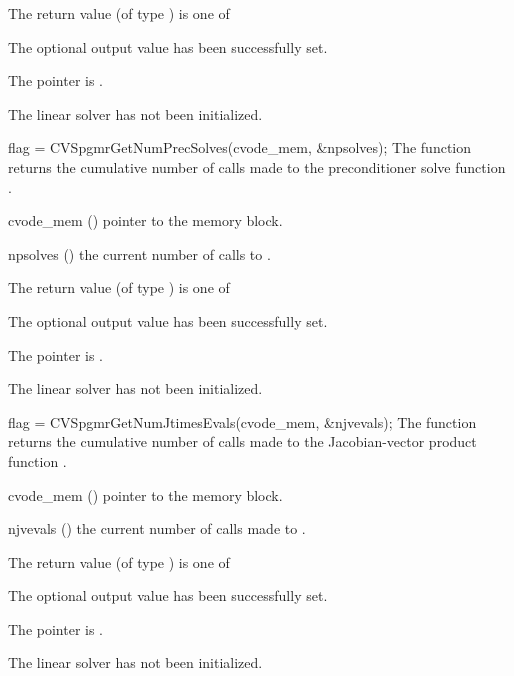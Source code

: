 {
  The return value  (of type ) is one of
  \begin{args}
  \item[\Id{CVSPGMR\_SUCCESS}] 
    The optional output value has been successfully set.
  \item[\Id{CVSPGMR\_MEM\_NULL}]
    The  pointer is .
  \item[\Id{CVSPGMR\_LMEM\_NULL}]
    The {\cvspgmr} linear solver has not been initialized.
  \end{args}
}
{}
{
  flag = CVSpgmrGetNumPrecSolves(cvode\_mem, \&npsolves);
}
{
  The function  returns the
  cumulative number of calls made to the preconditioner 
  solve function .
}
{
  \begin{args}
  \item[cvode\_mem] ()
    pointer to the {\cvodes} memory block.
  \item[npsolves] ()
    the current number of calls to .
  \end{args}
}
{
  The return value  (of type ) is one of
  \begin{args}
  \item[\Id{CVSPGMR\_SUCCESS}] 
    The optional output value has been successfully set.
  \item[\Id{CVSPGMR\_MEM\_NULL}]
    The  pointer is .
  \item[\Id{CVSPGMR\_LMEM\_NULL}]
    The {\cvspgmr} linear solver has not been initialized.
  \end{args}
}
{}
{
  flag = CVSpgmrGetNumJtimesEvals(cvode\_mem, \&njvevals);
}
{
  The function  returns the
  cumulative number of calls made to the Jacobian-vector product function
  .
}
{
  \begin{args}
  \item[cvode\_mem] ()
    pointer to the {\cvodes} memory block.
  \item[njvevals] ()
    the current number of calls made to .
  \end{args}
}
{
  The return value  (of type ) is one of
  \begin{args}
  \item[\Id{CVSPGMR\_SUCCESS}] 
    The optional output value has been successfully set.
  \item[\Id{CVSPGMR\_MEM\_NULL}]
    The  pointer is .
  \item[\Id{CVSPGMR\_LMEM\_NULL}]
    The {\cvspgmr} linear solver has not been initialized.
  \end{args}
}
